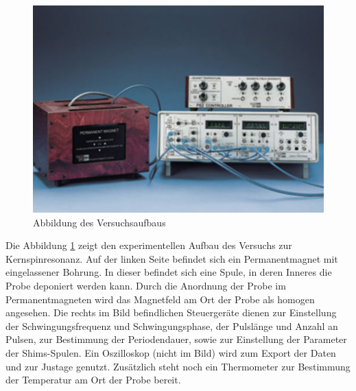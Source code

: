 \begin{figure}[H]
  \centering
  \includegraphics[scale=0.5]{resources/aufbau.png}
  \caption{Abbildung des Versuchsaufbaus \cite{skizze}}
  \label{fig:aufbau}
\end{figure}
\noindent Die Abbildung \ref{fig:aufbau} zeigt den experimentellen Aufbau des
Versuchs zur Kernspinresonanz. Auf der linken Seite befindet sich ein
Permanentmagnet mit eingelassener Bohrung. In dieser befindet sich eine Spule,
in deren Inneres die Probe deponiert werden kann. Durch die Anordnung der Probe
im Permanentmagneten wird das Magnetfeld am Ort der Probe als homogen angesehen.
Die rechts im Bild befindlichen Steuergeräte dienen zur Einstellung der
Schwingungsfrequenz und Schwingungsphase, der Pulslänge und Anzahl an Pulsen, zur Bestimmung
der Periodendauer, sowie zur Einstellung der Parameter der Shims-Spulen. Ein
Oszilloskop (nicht im Bild) wird zum Export der
Daten und zur Justage genutzt. Zusätzlich steht noch ein Thermometer zur
Bestimmung der Temperatur am Ort der Probe bereit.
